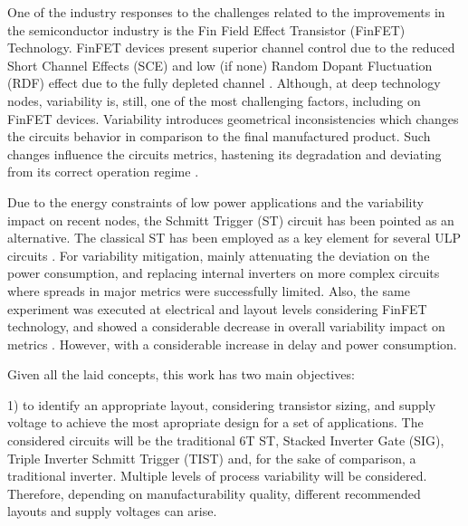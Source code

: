 \documentclass[pgmicro,diss,english]{iiufrgs}
\begin{document}
    One of the industry responses to the challenges related to the improvements in the semiconductor industry is the Fin Field Effect Transistor (FinFET) Technology. FinFET devices present superior channel control due to the reduced Short Channel Effects (SCE) and low (if none) Random Dopant Fluctuation (RDF) effect due to the fully depleted channel \cite{farkhani2014comparative}. Although, at deep technology nodes, variability is, still, one of the most challenging factors, including on FinFET devices. Variability introduces geometrical inconsistencies which changes the circuits behavior in comparison to the final manufactured product. Such changes influence the circuits metrics, hastening its degradation and deviating from its correct operation regime \cite{abbas:15} \cite{nassif:08}.

    Due to the energy constraints of low power applications and the variability impact on recent nodes, the Schmitt Trigger (ST) circuit has been pointed as an alternative. The classical ST has been employed as a key element for several ULP circuits \cite{kulkarni2007160, 5746345, melek:17, lotze2017ultra}. For variability mitigation, mainly attenuating the deviation on the power consumption, and replacing internal inverters on more complex circuits \cite{dokania2015circuit} where spreads in major metrics were successfully limited. Also, the same experiment was executed at electrical and layout levels considering FinFET technology, and showed a considerable decrease in overall variability impact on metrics \cite{toledo2018pros,moraes2018evaluation}. However, with a considerable increase in delay and power consumption.


	Given all the laid concepts, this work has two main objectives:

	1) to identify an appropriate layout, considering transistor sizing, and supply voltage to achieve the most apropriate design for a set of applications. The considered circuits will be the traditional 6T ST, Stacked Inverter Gate (SIG), Triple Inverter Schmitt Trigger (TIST) and, for the sake of comparison, a traditional inverter. Multiple levels of process variability will be considered. Therefore, depending on manufacturability quality, different recommended layouts and supply voltages can arise.
\end{document}
